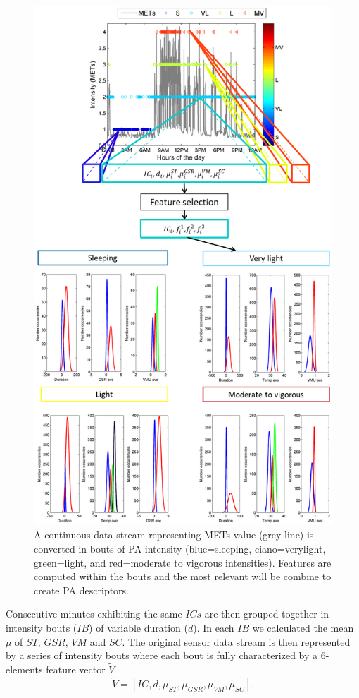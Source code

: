 \begin{figure}[ht]
  \centering
  \includegraphics[width=.45\textwidth]{figure/eps/figure_11_together_mod_plus_arrow.eps}
  \caption[]{A continuous data stream representing METs value (grey line) is converted in bouts of PA intensity (blue=sleeping, ciano=verylight, green=light, and red=moderate to vigorous intensities). Features are computed within the bouts and the most relevant will be combine to create PA descriptors.}
  \label{fig:1}
\end{figure}
Consecutive minutes exhibiting the same $ICs$ are then grouped together in intensity bouts ($IB$) of variable duration ($d$). In each $IB$ we calculated the mean $\mu$ of $ST$, $GSR$, $VM$ and $SC$.
The original sensor data stream is then represented by a series of intensity bouts where each bout is fully characterized by a 6-elements feature vector $\tilde{V}$ 
\begin{equation}
\tilde{V} = [IC, d, \mu_{ST}, \mu_{GSR}, \mu_{VM}, \mu_{SC}].
\end{equation}
